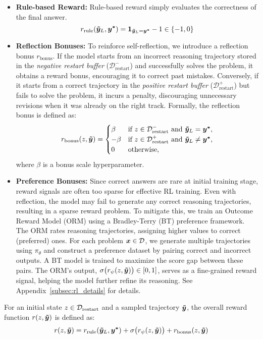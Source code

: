 \begin{itemize}[leftmargin=*]
 \item \textbf{Rule-based Reward:} Rule-based reward simply evaluates the correctness of the final answer.
    \[
     r_{\text{rule}}(\boldsymbol{\Tilde{y}}_L, \boldsymbol{y^*}) = \mathbf{1}_{\boldsymbol{\Tilde{y}}_L=\boldsymbol{y^*}}-1 \in \{-1, 0\}
    \]
    \item \textbf{Reflection Bonuses:} 
 To reinforce self-reflection, we introduce a reflection bonus \(r_{\text{bonus}}\).  
If the model starts from an incorrect reasoning trajectory stored in the \textit{negative restart buffer} (\(\mathcal{D}^-_{\text{restart}}\)) and successfully solves the problem, it obtains a reward bonus, encouraging it to correct past mistakes. Conversely, if it starts from a correct trajectory in the \textit{positive restart buffer} (\(\mathcal{D}^+_{\text{restart}}\)) but fails to solve the problem, it incurs a penalty, discouraging unnecessary revisions when it was already on the right track.  
Formally, the reflection bonus is defined as:  
\[
r_\text{bonus}(z, \boldsymbol{\Tilde{y}}) = 
\begin{cases}
\beta & \text{if } z \in \mathcal{D}^-_{\text{restart}} \text{ and } \boldsymbol{\Tilde{y}}_L = \boldsymbol{y^*}, \\
-\beta & \text{if } z \in \mathcal{D}^+_{\text{restart}} \text{ and } \boldsymbol{\Tilde{y}}_L \neq \boldsymbol{y^*}, \\
0 & \text{otherwise},
\end{cases}
\]
where \(\beta\) is a bonus scale hyperparameter.

\item \textbf{Preference Bonuses:} Since correct answers are rare at initial training stage, reward signals are often too sparse for effective RL training. Even with reflection, the model may fail to generate any correct reasoning trajectories, resulting in a sparse reward problem.  
To mitigate this, we train an Outcome Reward Model (ORM) using a Bradley-Terry (BT) preference framework. The ORM rates reasoning trajectories, assigning higher values to correct (preferred) ones.  
For each problem \(\boldsymbol{x} \in \mathcal{D}\), we generate multiple trajectories using \(\pi_\theta\) and construct a preference dataset by pairing correct and incorrect outputs. A BT model is trained to maximize the score gap between these pairs. The ORM's output, \(\sigma\bigl(r_\psi(z, \boldsymbol{\Tilde{y}})\bigr) \in [0,1]\), serves as a fine-grained reward signal, helping the model further refine its reasoning. See Appendix~\ref{subsec:rl_details} for details.
\end{itemize}
For an initial state \( z \in \mathcal{D}_{\text{restart}} \) and a sampled trajectory \( \boldsymbol{\Tilde{y}} \), the overall reward function \( r(z, \boldsymbol{\Tilde{y}}) \) is defined as:
\[
r(z, \boldsymbol{\Tilde{y}}) =  r_{\text{rule}}(\boldsymbol{\Tilde{y}}_L, \boldsymbol{y^*})+\sigma\big(r_\psi(z, \boldsymbol{\Tilde{y}})\big) + r_\text{bonus}(z, \boldsymbol{\Tilde{y}})
\]
 




